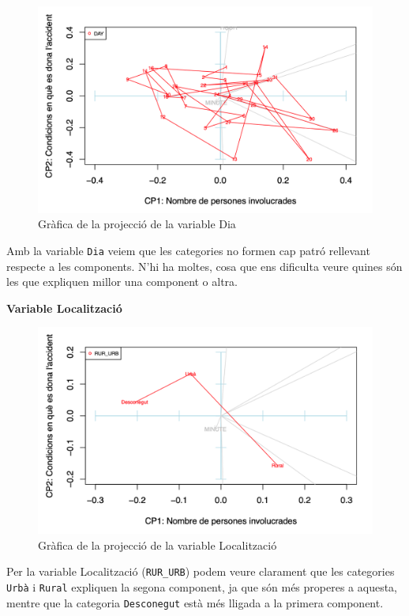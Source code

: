 \documentclass[11pt,longbibliography]{article}
\theoremstyle{definition}
\theoremstyle{remark}
\begin{document}
\begin{figure}[H]
\begin{center}
\includegraphics[width=12cm]{acp7}
\end{center}
\caption{Gràfica de la projecció de la variable Dia}
\label{fig:ACP7}
\end{figure}


Amb la variable \texttt{Dia} veiem que les categories no formen cap patró rellevant respecte a les components. N'hi ha moltes, cosa que ens dificulta veure quines són les que expliquen millor una component o altra.



\textbf{Variable Localització}

\begin{figure}[H]
\begin{center}
\includegraphics[width=12cm]{acp8}
\end{center}
\caption{Gràfica de la projecció de la variable Localització}
\label{fig:ACP8}
\end{figure}


Per la variable Localització (\texttt{RUR\_URB}) podem veure clarament que les categories \texttt{Urbà} i \texttt{Rural} expliquen la segona component, ja que són més properes a aquesta, mentre que la categoria \texttt{Desconegut} està més lligada a la primera component.
\end{document}

